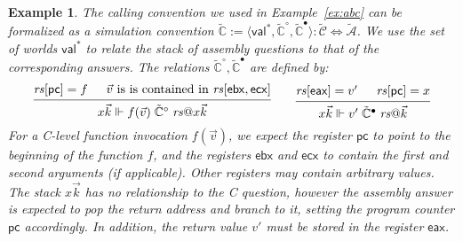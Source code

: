 \documentclass[11pt,oneside,draft]{book}
\newtheorem{example}[theorem]{Example}
\theoremstyle{definition}
\newcommand{\kw}[1]{\ensuremath{ \mathsf{#1} }}
\newcommand{\que}{\circ}         %
\newcommand{\ans}{\bullet}       %
\begin{document}
\begin{example} %
The calling convention we used in Example~\ref{ex:abc}
can be formalized as a simulation convention
$\tilde{\mathbb{C}} :=
  \langle \kw{val}^*, \tilde{\mathbb{C}}^\que, \tilde{\mathbb{C}}^\ans \rangle :
    \tilde{\mathcal{C}} \Leftrightarrow \tilde{\mathcal{A}}$.
We use the set of worlds $\kw{val}^*$
to relate the stack of
assembly questions to that of the corresponding answers.
The relations $\tilde{\mathbb{C}}^\que, \tilde{\mathbb{C}}^\ans$
are defined by:
\[
  \begin{prooftree}
    \hypo{\mathit{rs}[\kw{pc}] = f}
    \hypo{\vec{v} \text{ is is contained in } \mathit{rs}[\kw{ebx}, \kw{ecx}]}
    \infer2{
      x \vec{k} \Vdash
      f(\vec{v}) \mathrel{\tilde{\mathbb{C}}^\que} \mathit{rs}@ x \vec{k}
    }
  \end{prooftree}
  \qquad
  \begin{prooftree}
    \hypo{\mathit{rs}[\kw{eax}] = v'}
    \hypo{\mathit{rs}[\kw{pc}] = x}
    \infer2{
      x \vec{k} \Vdash
      v' \mathrel{\tilde{\mathbb{C}}^\ans} \mathit{rs}@\vec{k}
    }
  \end{prooftree}
\]
For a C-level function invocation $f(\vec{v})$,
we expect the register $\kw{pc}$ to point to
the beginning of the function $f$,
and the registers $\kw{ebx}$ and $\kw{ecx}$
to contain the first and second arguments (if applicable).
Other registers may contain arbitrary values.
The stack $x \vec{k}$ has no relationship to the C question,
however the assembly answer is expected to pop the return address
and branch to it, setting the program counter $\kw{pc}$ accordingly.
In addition,
the return value $v'$ must be stored
in the register $\kw{eax}$.
\end{example}
\end{document}
